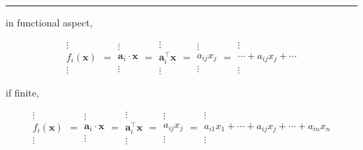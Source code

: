 \documentclass[
]{book}
\theoremstyle{definition}
\theoremstyle{definition}
\theoremstyle{definition}
\theoremstyle{definition}
\theoremstyle{remark}
\begin{document}
\begin{center}\rule{0.5\linewidth}{0.5pt}\end{center}

in functional aspect,

\[
\begin{array}{c}
\vdots\\
f_{{\scriptscriptstyle i}}\left(\boldsymbol{x}\right)\\
\vdots
\end{array}=\begin{array}{c}
\vdots\\
\boldsymbol{a}_{{\scriptscriptstyle i}}\cdot\boldsymbol{x}\\
\vdots
\end{array}=\begin{array}{c}
\vdots\\
\boldsymbol{a}_{{\scriptscriptstyle i}}^{\intercal}\boldsymbol{x}\\
\vdots
\end{array}=\begin{array}{c}
\vdots\\
a_{{\scriptscriptstyle ij}}x_{{\scriptscriptstyle j}}\\
\vdots
\end{array}=\begin{array}{c}
\vdots\\
\cdots+a_{{\scriptscriptstyle ij}}x_{{\scriptscriptstyle j}}+\cdots\\
\vdots
\end{array}
\]

if finite,

\[
\begin{array}{c}
\vdots\\
f_{{\scriptscriptstyle i}}\left(\boldsymbol{x}\right)\\
\vdots
\end{array}=\begin{array}{c}
\vdots\\
\boldsymbol{a}_{{\scriptscriptstyle i}}\cdot\boldsymbol{x}\\
\vdots
\end{array}=\begin{array}{c}
\vdots\\
\boldsymbol{a}_{{\scriptscriptstyle i}}^{\intercal}\boldsymbol{x}\\
\vdots
\end{array}=\begin{array}{c}
\vdots\\
a_{{\scriptscriptstyle ij}}x_{{\scriptscriptstyle j}}\\
\vdots
\end{array}=\begin{array}{c}
\vdots\\
a_{{\scriptscriptstyle i1}}x_{{\scriptscriptstyle 1}}+\cdots+a_{{\scriptscriptstyle ij}}x_{{\scriptscriptstyle j}}+\cdots+a_{{\scriptscriptstyle in}}x_{{\scriptscriptstyle n}}\\
\vdots
\end{array}
\]
\end{document}
